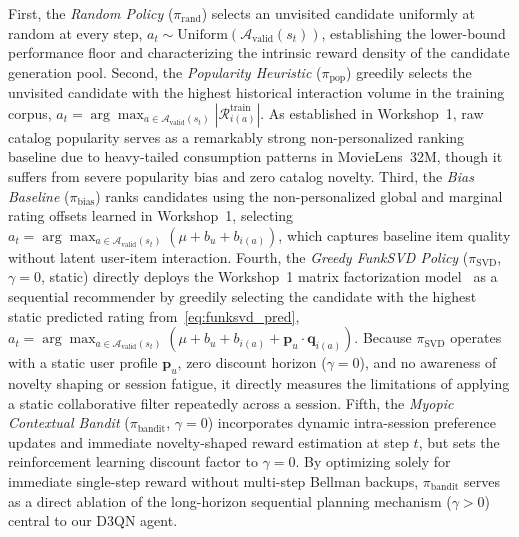 First, the \emph{Random Policy} ($\pi_{\text{rand}}$) selects an unvisited candidate uniformly at random at every step, $a_t \sim \text{Uniform}(\mathcal{A}_{\text{valid}}(s_t))$, establishing the lower-bound performance floor and characterizing the intrinsic reward density of the candidate generation pool. Second, the \emph{Popularity Heuristic} ($\pi_{\text{pop}}$) greedily selects the unvisited candidate with the highest historical interaction volume in the training corpus, $a_t = \arg\max_{a \in \mathcal{A}_{\text{valid}}(s_t)} |\mathcal{R}_{i(a)}^{\text{train}}|$. As established in Workshop~1, raw catalog popularity serves as a remarkably strong non-personalized ranking baseline due to heavy-tailed consumption patterns in MovieLens~32M, though it suffers from severe popularity bias and zero catalog novelty. Third, the \emph{Bias Baseline} ($\pi_{\text{bias}}$) ranks candidates using the non-personalized global and marginal rating offsets learned in Workshop~1, selecting $a_t = \arg\max_{a \in \mathcal{A}_{\text{valid}}(s_t)} (\mu + b_u + b_{i(a)})$, which captures baseline item quality without latent user-item interaction. Fourth, the \emph{Greedy FunkSVD Policy} ($\pi_{\text{SVD}}$, $\gamma = 0$, static) directly deploys the Workshop~1 matrix factorization model~\cite{koren2009matrix} as a sequential recommender by greedily selecting the candidate with the highest static predicted rating from~\eqref{eq:funksvd_pred}, $a_t = \arg\max_{a \in \mathcal{A}_{\text{valid}}(s_t)} (\mu + b_u + b_{i(a)} + \mathbf{p}_u \cdot \mathbf{q}_{i(a)})$. Because $\pi_{\text{SVD}}$ operates with a static user profile $\mathbf{p}_u$, zero discount horizon ($\gamma = 0$), and no awareness of novelty shaping or session fatigue, it directly measures the limitations of applying a static collaborative filter repeatedly across a session. Fifth, the \emph{Myopic Contextual Bandit} ($\pi_{\text{bandit}}$, $\gamma = 0$) incorporates dynamic intra-session preference updates and immediate novelty-shaped reward estimation at step $t$, but sets the reinforcement learning discount factor to $\gamma = 0$. By optimizing solely for immediate single-step reward without multi-step Bellman backups, $\pi_{\text{bandit}}$ serves as a direct ablation of the long-horizon sequential planning mechanism ($\gamma > 0$) central to our D3QN agent.

